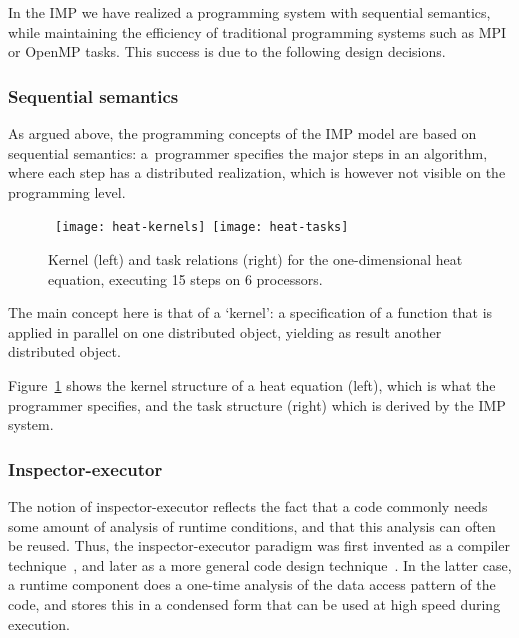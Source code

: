 
In the \acf{IMP} we have realized a programming system with sequential
semantics, while maintaining the efficiency of traditional programming
systems such as MPI or OpenMP tasks. This success is due to the following
design decisions.

\subsubsection{Sequential semantics}

As argued above, the programming concepts of the IMP model
are based on sequential semantics:
a~programmer specifies the major steps in an algorithm,
where each step has a distributed realization, which is however not visible
on the programming level.
%
\begin{figure}[p]
\hbox\bgroup
  \texttt{[image: heat-kernels]}
  \texttt{[image: heat-tasks]}
  \egroup
  \caption{Kernel (left) and task relations (right)
    for the one-dimensional heat equation,
    executing 15 steps on 6 processors.}
  \label{fig:heat-flow}
\end{figure}
%
The main concept here is that of a `kernel':
a specification of a function that is applied in parallel on one distributed
object, yielding as result another distributed object.

Figure~\ref{fig:heat-flow} shows the kernel structure of a heat
equation (left), which is what the programmer specifies,
and the task structure (right) which is derived by the IMP system.

\subsubsection{Inspector-executor}

The notion of inspector-executor reflects the fact that a code commonly
needs some amount of analysis of runtime conditions, and that this analysis
can often be reused. Thus, the inspector-executor paradigm was first
invented as a compiler technique~\cite{Koelbel:parallel-loops},
and later as a more general code design technique~\cite{Sussman92partiprimitives}.
In the latter case,
a runtime component does a one-time analysis of the data access pattern
of the code, and stores this in a condensed form that can be used at high speed
during execution.

